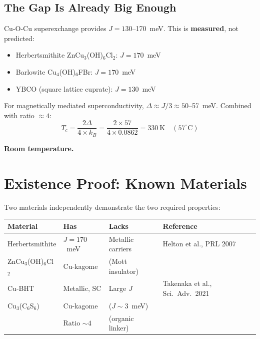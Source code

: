 \documentclass[11pt, a4paper]{article}
\begin{document}
\subsection{The Gap Is Already Big Enough}

Cu-O-Cu superexchange provides $J = 130$--170~meV. This is
\textbf{measured}, not predicted:
\begin{itemize}[nosep]
  \item Herbertsmithite ZnCu$_3$(OH)$_6$Cl$_2$: $J = 170$~meV
  \item Barlowite Cu$_4$(OH)$_6$FBr: $J = 170$~meV
  \item YBCO (square lattice cuprate): $J = 130$~meV
\end{itemize}

For magnetically mediated superconductivity,
$\Delta \approx J/3 \approx 50$--57~meV. Combined with ratio
$\approx 4$:
\begin{equation}
  T_c = \frac{2\Delta}{4 \times k_B}
      = \frac{2 \times 57}{4 \times 0.0862}
      = 330~\text{K} \quad (57^\circ\text{C})
\end{equation}

\textbf{Room temperature.}

\section{Existence Proof: Known Materials}

Two materials independently demonstrate the two required
properties:

\begin{center}
\begin{tabular}{@{}lp{3cm}p{3cm}p{4cm}@{}}
\toprule
\textbf{Material} & \textbf{Has} & \textbf{Lacks} & \textbf{Reference} \\
\midrule
Herbertsmithite & $J = 170$~meV & Metallic carriers &
  Helton et al., PRL 2007 \\
  ZnCu$_3$(OH)$_6$Cl$_2$ & Cu-kagome & (Mott insulator) & \\
\midrule
Cu-BHT & Metallic, SC & Large $J$ &
  Takenaka et al., Sci.\ Adv.\ 2021 \\
  Cu$_3$(C$_6$S$_6$) & Cu-kagome & ($J \sim 3$~meV) & \\
  & Ratio $\sim 4$ & (organic linker) & \\
\bottomrule
\end{tabular}
\end{center}
\end{document}
